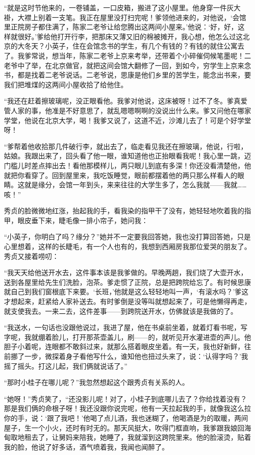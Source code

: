 \par “就是这时节他来的，一卷铺盖，一口皮箱，搬进了这小屋里。他身穿一件灰大褂，大襟上别着一支笔。我正在屋里没打扫完呢！爹领他进来的，对他说，‘会馆里正院房子都住满了，陈家二老爷让给您腾出这两间小屋来。’他说：‘好，好，这样就很好。’爹给他打开行李，把那床又薄又旧的棉被摊开，我心想，他怎么过这北京的大冬天？小英子，住在会馆念书的学生，有几个有钱的？有钱的就住公寓去了。我爹常说，想当年，陈家二老爷上京来考举，还带着个小碎催伺候笔墨呢！二老爷中了举，在北京做官，就把这间会馆大翻修了一回，到如今，穷学生上京来念书，都是找着二老爷说话。二老爷说，思康是他们乡里的苦学生，能念出书来，要我们把堆煤的这两间小屋收拾了给他住。
\par “我还在赶着擦玻璃呢，没正眼看他。我爹对他说，这床被呀！过不了冬。爹真爱管人家的事，他准是不好意思了，就乱嗯嗯啊啊的没说出什么来。爹又问他在哪家学堂，他说在北京大学，喝！我爹又说了，这道不近，沙滩儿去了！可是个好学堂呀！
\par “爹帮着他收拾那几件破行李，就出去了，临走看见我还在擦玻璃，他说，行啦，姑娘。我跟出来了，回头看了他一眼，谁知道他也正抬眼看我呢！我心里一跳，迈门槛儿时差点摔出去！看他那模样儿，两只眼儿到底有多深！你还没看清楚他，他就把你看穿了。回到屋里来，我吃饭睡觉，眼前都摆着他的两只那么样看人的眼睛。这就是缘分，会馆一年到头，来来往往的大学生多了，怎么我就——我就……咳！”
\par 秀贞的脸微微地红涨，抬起我的手，看我染的指甲干了没有，她轻轻地吹着我的指甲，眼皮垂下来，睫毛像一排小帘子，她问我：
\par “小英子，你明白了吗？缘分？”她并不一定要我回答她，我也没打算回答她，只是心里想着，这样的长睫毛，有一个人也有的，我想到西厢房我那位爱哭的朋友了。秀贞又接着唠叨：
\par “我天天给他送开水去，这件事本该是我爹做的。早晚两趟，我们烧了大壶开水，送到各屋里给先生们洗脸，泡茶。爹走惯了正院，总是把跨院给忘了。有时候思康就自己到我们窗根底下来要。‘长班，’他就是这么轻轻地叫一声，‘有滚水吗？’爹这才想起来，赶紧给人家补送去。有时爹倒是没等叫就想起来了，可是他懒得再走，就支使我去。一来二去，这件差事——到跨院送开水，仿佛就该是我做的了。
\par “我送水，一句话也没跟他说过，我进了屋，他在书桌前坐着，就着灯看书呢，写字呢，我就绷着脸儿，打开那茶壶盖儿，刷——的，就听见开水灌进壶的声儿。他胆子小着呢，连眼都不敢斜过来，就那么搭着眼皮坐着。有一天，我也好新鲜，往前挪了一步，微探着身子看他写什么，谁知他也扭过头来了，说：‘认得字吗？’我摇了摇头。打这儿起，我们俩就说话了。”
\par “那时小桂子在哪儿呢？”我忽然想起这个跟秀贞有关系的人。
\par “她呀！”秀贞笑了，“还没影儿呢！对了，小桂子到底哪儿去了？你给找着没有？那是我们俩的命根子呀！我还没跟你说完呢，他有一天拉起我的手，就像我这么拉你的手，说：‘跟了我吧！’他喝了点儿酒，我也迷糊了，他喝酒是为的取暖，两间屋子，生一个小火，还时有时无的。那天风挺大，吹得门框直响，我爹跟我娘回海甸取地租去了，让舅妈来陪我，她睡了，我就溜到这跨院里来。他的脸滚烫，贴着我的脸，他说了好多话，酒气喷着我，我闻也闻醉了。
